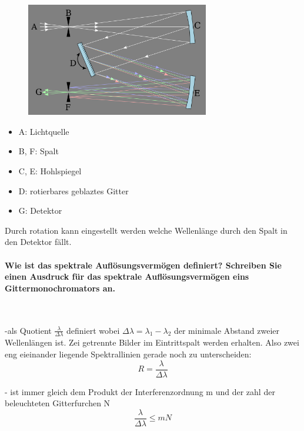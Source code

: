 \documentclass[a4paper, 11pt, ngerman, parskip=half-]{scrartcl}
\begin{document}
\begin{figure}[H]
    \centering
    \includegraphics[width=8cm]{image/22/Czerny-Turner.png}
\end{figure}
\begin{itemize}
    \item[] A: Lichtquelle
    \item[] B, F: Spalt
    \item[] C, E: Hohlspiegel
    \item[] D: rotierbares geblaztes Gitter
    \item[] G: Detektor
\end{itemize}
Durch rotation kann eingestellt werden welche Wellenlänge durch den Spalt in den Detektor fällt.
\paragraph{Wie ist das spektrale Auflösungsvermögen definiert? Schreiben Sie einen Ausdruck für das
spektrale Auflösungsvermögen eins Gittermonochromators an.} ~

-als Quotient $\frac{\lambda}{\Delta \lambda}$ definiert wobei $\Delta \lambda = \lambda_1 - \lambda_2$ der minimale Abstand zweier Wellenlängen ist. Zei getrennte Bilder im Eintrittspalt werden erhalten. Also zwei eng eieinander liegende Spektrallinien gerade noch zu unterscheiden:
\begin{equation}
R = \frac{\lambda}{\Delta \lambda}
\end{equation}

- ist immer gleich dem Produkt der Interferenzordnung m und der zahl der beleuchteten Gitterfurchen N
\begin{equation}
\frac{\lambda}{\Delta \lambda} \leq mN
\end{equation}
\newpage
\end{document}
